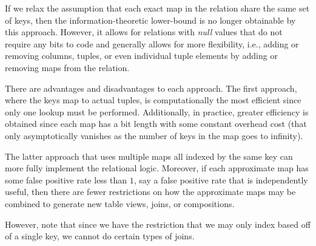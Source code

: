\documentclass[ ../main.tex]{subfiles}
\begin{document}
If we relax the assumption that each exact map in the relation share the same set of keys, then the information-theoretic lower-bound is no longer obtainable by this approach. However, it allows for relations with \emph{null} values that do not require any bits to code and generally allows for more flexibility, i.e., adding or removing columns, tuples, or even individual tuple elements by adding or removing maps from the relation.

There are advantages and disadvantages to each approach. The first approach, where the keys map to actual tuples, is computationally the most efficient since only one lookup must be performed. Additionally, in practice, greater efficiency is obtained since each map has a bit length with some constant overhead cost (that only asymptotically vanishes as the number of keys in the map goes to infinity).




The latter approach that uses multiple maps all indexed by the same key can more fully implement the relational logic. Moreover, if each approximate map has some false positive rate less than $1$, say a false positive rate that is independently useful, then there are fewer restrictions on how the approximate maps may be combined to generate new table views, joins, or compositions.

However, note that since we have the restriction that we may only index based off of a single key, we cannot do certain types of joins.
\end{document}
